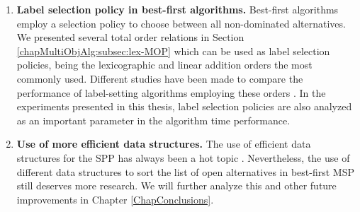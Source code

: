 \begin{enumerate}
	\item \textbf{Label selection policy in best-first algorithms.} Best-first algorithms employ a selection policy to choose between all non-dominated alternatives. We presented several total order relations in Section \ref{chapMultiObjAlg:subsec:lex-MOP} which can be used as label selection policies, being the lexicographic and linear addition orders the most commonly used. Different studies have been made to compare the performance of label-setting algorithms employing these orders \citep{Iori2010, Machuca2012}. In the experiments presented in this thesis, label selection policies are also analyzed as an important parameter in the algorithm time performance.
	
	\item \textbf{Use of more efficient data structures.} The use of efficient data structures for the SPP has always been a hot topic \citep{Ahuja1990,Zhan1997,Cherkassky1999,Cazenave2006,Mehlhorn2007}. Nevertheless, the use of different data structures to sort the list of open alternatives in best-first MSP still deserves more research. We will further analyze this and other future improvements in Chapter \ref{ChapConclusions}.  
\end{enumerate}
